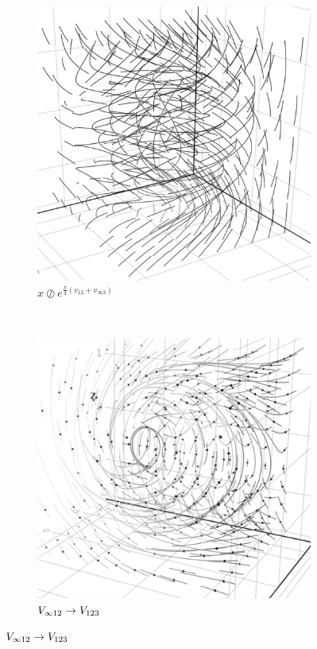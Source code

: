 \documentclass{juliacon}
\begin{document}
\begin{figure}[t]
	\centering
	\caption{Variations of sub-manifold vector field mappings in $\mb R^4$.}
	\begin{subfigure}[b]{0.23\textwidth}
		\includegraphics[width=\textwidth]{img/orb.png}
		\caption{$x\oslash e^{\frac\pi4(v_{12}+v_{\infty3})}$}
	\end{subfigure}
	~
	\begin{subfigure}[b]{0.23\textwidth}
		\includegraphics[width=\textwidth]{img/wave.png}
		\caption{$V_{\infty12}\rightarrow V_{123}$}
	\end{subfigure}
\end{figure}
\end{document}
